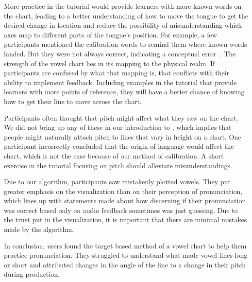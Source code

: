 More practice in the tutorial would provide learners with more known words on the chart, leading to a better understanding of how to move the tongue to get the desired change in location and reduce the possibility of misunderstanding which axes map to different parts of the tongue's position. For example, a few participants mentioned the calibration words to remind them where known words landed. But they were not always correct, indicating a conceptual error~\cite{booth1991errors}. The strength of the vowel chart lies in its mapping to the physical realm. If participants are confused by what that mapping is, that conflicts with their ability to implement feedback. Including examples in the tutorial that provide learners with more points of reference, they will have a better chance of knowing how to get their line to move across the chart. 

Participants often thought that pitch might affect what they saw on the chart. We did not bring up any of these in our introduction to \visowel{}, which implies that people might naturally attach pitch to lines that vary in height on a chart. One participant incorrectly concluded that the origin of language would affect the chart, which is not the case because of our method of calibration. A short exercise in the tutorial focusing on pitch should alleviate misunderstandings.

Due to our algorithm, participants saw mistakenly plotted vowels. They put greater emphasis on the visualization than on their perception of pronunciation, which lines up with statements made about how discerning if their pronunciation was correct based only on audio feedback sometimes was just guessing. Due to the trust put in the visualization, it is important that there are minimal mistakes made by the algorithm. 

In conclusion, users found the target based method of a vowel chart to help them practice pronunciation. They struggled to understand what made vowel lines long or short and attributed changes in the angle of the line to a change in their pitch during production. 
